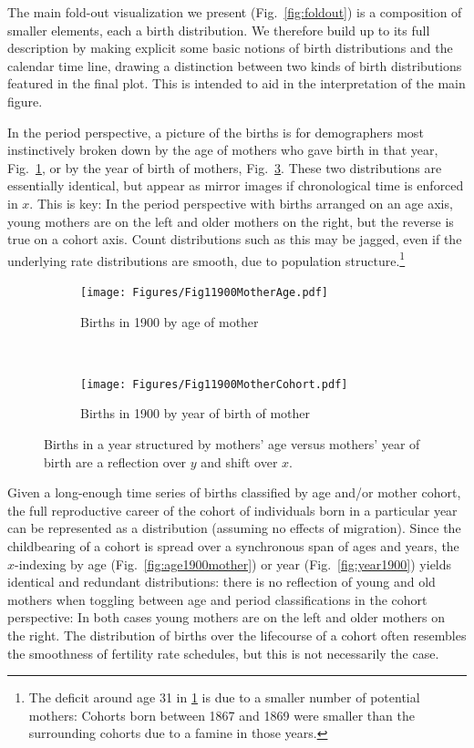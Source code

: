 
The main fold-out visualization we present (Fig.~\ref{fig:foldout}) is a composition of smaller elements, each a birth distribution. We therefore build up to its full description by making explicit some basic notions of birth distributions and the calendar time line, drawing a distinction between two kinds of birth distributions featured in the final plot. This is intended to aid in the interpretation of the main figure. 

In the period perspective, a picture of the births is for demographers most instinctively broken down by the age of mothers who gave birth in that year, Fig.~\ref{fig:agemother}, or by the year of birth of mothers, Fig.~\ref{fig:cohmother}. These two distributions are essentially identical, but appear as mirror images if chronological time is enforced in $x$. This is key: In the period perspective with births arranged on an age axis, young mothers are on the left and older mothers on the right, but the reverse is true on a cohort axis. Count distributions such as this may be jagged, even if the underlying rate distributions are smooth, due to population structure.\footnote{The deficit around age 31 in \ref{fig:agemother} is due to a smaller number of potential mothers: Cohorts born between 1867 and 1869 were smaller than the surrounding cohorts due to a famine in those years.} 

\begin{figure}[ht!]
\begin{subfigure}[t]{0.5\textwidth}
        \centering
        \texttt{[image: Figures/Fig11900MotherAge.pdf]}
        \caption{Births in 1900 by age of mother}
        \label{fig:agemother}
\end{subfigure}
~
\begin{subfigure}[t]{0.5\textwidth}
        \centering
        \texttt{[image: Figures/Fig11900MotherCohort.pdf]}
        \caption{Births in 1900 by year of birth of mother}
          \label{fig:cohmother}
\end{subfigure}
\caption{Births in a year structured by mothers' age versus mothers' year of birth are a
reflection over $y$ and shift over $x$. }
\end{figure}

Given a long-enough time series of births classified by age and/or mother cohort, the full reproductive career of the cohort of individuals born in a particular year can be represented as a distribution (assuming no effects of migration). Since the childbearing of a cohort is spread over a synchronous span of ages and years, the $x$-indexing by age (Fig.~\ref{fig:age1900mother}) or year (Fig.~\ref{fig:year1900}) yields identical and redundant distributions: there is no reflection of young and old mothers when toggling between age and period classifications in the cohort perspective: In both cases young mothers are on the left and older mothers on the right. The distribution of births over the lifecourse of a cohort often resembles the smoothness of fertility rate schedules, but this is not necessarily the case.

